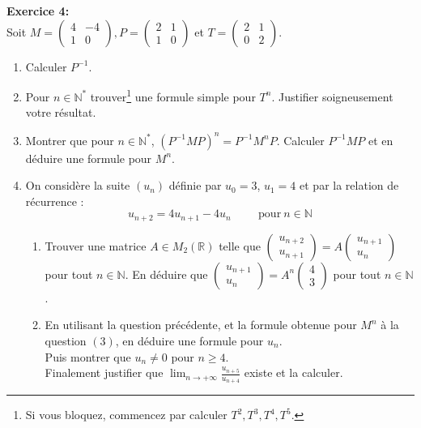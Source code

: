 \documentclass[a4paper, 10pt]{article}
\theoremstyle{plain}
\newcommand{\R}{\mathbb{R}}
\newcommand{\N}{\mathbb{N}}
\begin{document}
\bigskip
\noindent
\textbf{Exercice 4:}\\
Soit 
$M=
\begin{pmatrix}
4 & -4 \\1&0
\end{pmatrix}
, P= 
\begin{pmatrix}
2&1\\1&0
\end{pmatrix}
$ et
$T=
\begin{pmatrix}
2&1\\0&2
\end{pmatrix}$.
\begin{enumerate}
\item 
Calculer $P^{-1}$.
\item Pour $n\in \N^*$ trouver\footnote{Si vous bloquez, 
commencez par calculer $T^2,T^3,T^4, T^5$.} une formule simple pour 
$T^n$. Justifier soigneusement votre résultat.
\item 
Montrer que pour $n\in \N^*$, $(P^{-1}MP)^n = P^{-1}M^nP$. 
Calculer $P^{-1}MP$ et en déduire une formule pour 
$M^n$.  
\item 
On considère la suite $(u_n)$ définie par 
$u_0 =3$, $u_1 =4$ et par la relation de récurrence : 
\[u_{n+2} = 4u_{n+1}-4u_n \hspace{1cm} \text{pour} \ n\in \N \]
\begin{enumerate}

\item
Trouver une matrice $A\in M_2(\R)$ telle que 
$\begin{pmatrix}
u_{n+2} \\ u_{n+1}
\end{pmatrix} = 
A 
\begin{pmatrix}
u_{n+1} \\u_n
\end{pmatrix}$
pour tout $n\in \N$. 
En déduire que 
$\begin{pmatrix}
u_{n+1}\\u_n
\end{pmatrix} = 
A^n 
\begin{pmatrix}
4\\3
\end{pmatrix}$ 
pour tout $n\in \N$.

\item
En utilisant la question précédente, et la formule obtenue pour 
$M^n$ à la question $(3)$, 
en déduire une formule pour $u_n$. \\
Puis montrer que 
$u_n \neq 0$ pour $n\geq 4$.\\
Finalement justifier que 
$\displaystyle \lim_{n\to + \infty} \frac{u_{n+5}}{u_{n+4}}$ existe et la calculer.

\end{enumerate}
\end{enumerate}
\end{document}
